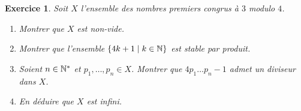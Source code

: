 \documentclass[11pt,a4paper]{article}
\newtheorem{ex}{Exercice}
\begin{document}

\begin{ex}\label{Dirichlet_faible}
Soit $X$ l'ensemble des nombres premiers congrus à $3$ modulo $4$. 
\begin{enumerate}


\item Montrer que $X$ est non-vide.

\item Montrer que l'ensemble $\{4k+1\mid k\in \mathbb{N}\}$ est stable par produit.

\item Soient $n\in \mathbb{N}^*$ et  $p_1,\ldots,p_n\in X$. Montrer que $4p_1\ldots p_n-1$ admet un diviseur dans $X$.

\item En déduire que $X$ est infini. 

\end{enumerate}
\end{ex}
\end{document}
